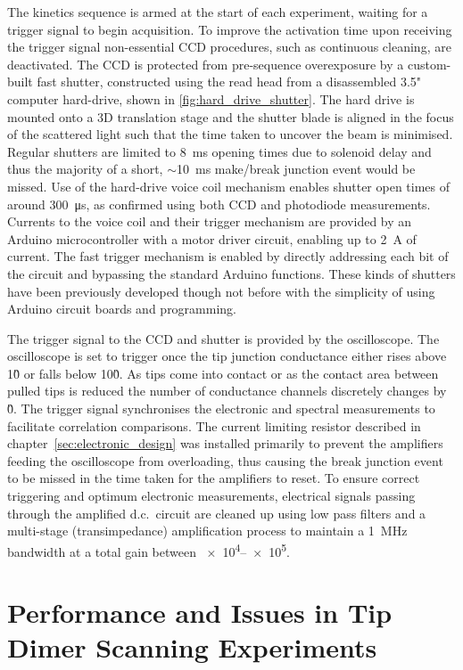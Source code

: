 \documentclass[12pt, a4paper, twoside]{book}
\begin{document}
The kinetics sequence is armed at the start of each experiment, waiting for a trigger signal to begin acquisition. To improve the activation time upon receiving the trigger signal non-essential CCD procedures, such as continuous cleaning, are deactivated. The CCD is protected from pre-sequence overexposure by a custom-built fast shutter, constructed using the read head from a disassembled 3.5" computer hard-drive, shown in \autoref{fig:hard_drive_shutter}. The hard drive is mounted onto a 3D translation stage and the shutter blade is aligned in the focus of the scattered light such that the time taken to uncover the beam is minimised. Regular shutters are limited to \SI{8}{ms} opening times due to solenoid delay and thus the majority of a short, $\sim$\SI{10}{ms} make/break junction event would be missed. Use of the hard-drive voice coil mechanism enables shutter open times of around \SI{300}{\micro\second}, as confirmed using both CCD and photodiode measurements. Currents to the voice coil and their trigger mechanism are provided by an Arduino microcontroller with a motor driver circuit, enabling up to \SI{2}{A} of current. The fast trigger mechanism is enabled by directly addressing each bit of the circuit and bypassing the standard Arduino functions. These kinds of shutters have been previously developed  though not before with the simplicity of using Arduino circuit boards and programming.

The trigger signal to the CCD and shutter is provided by the oscilloscope. The oscilloscope is set to trigger once the tip junction conductance either rises above 1\G0 or falls below 10\G0. As tips come into contact or as the contact area between pulled tips is reduced the number of conductance channels discretely changes by \G0. The trigger signal synchronises the electronic and spectral measurements to facilitate correlation comparisons.
The current limiting resistor described in chapter~\ref{sec:electronic_design} was installed primarily to prevent the amplifiers feeding the oscilloscope from overloading, thus causing the break junction event to be missed in the time taken for the amplifiers to reset.
To ensure correct triggering and optimum electronic measurements, electrical signals passing through the amplified d.c.\ circuit are cleaned up using low pass filters and a multi-stage (transimpedance) amplification process to maintain a \SI{1}{MHz} bandwidth at a total gain between \num{e4}--\num{e5}.

\FloatBarrier
\section{Performance and Issues in Tip Dimer Scanning Experiments}
\end{document}
